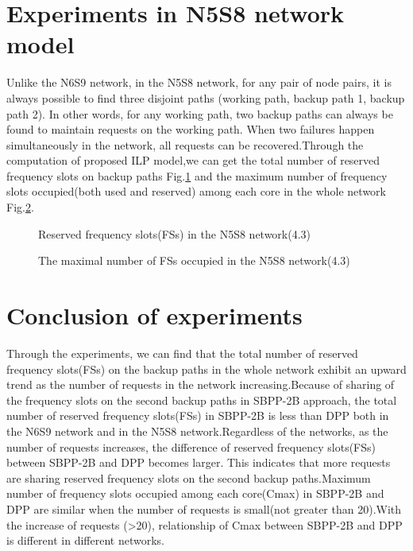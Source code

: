 \documentclass[a4paper,11pt]{report}
\begin{document}
\section{Experiments in N5S8 network model}
    Unlike the N6S9 network, in the N5S8 network, for any pair of node pairs, it is always possible to find three disjoint paths (working path, backup path 1, backup path 2). In other words, for any working path, two backup paths can always be found to maintain requests on the working path. When two failures happen simultaneously in the network, all requests can be recovered.Through the computation of proposed ILP model,we can get the total number of reserved frequency slots on backup paths Fig.\ref{figure:N5_FS} and the maximum number of frequency slots occupied(both used and reserved) among each core in the whole network Fig.\ref{figure:N5_Cmax}.
    
    \begin{figure}[htbp]
    \begin{center}
    \end{center}
    \caption{Reserved frequency slots(FSs) in the N5S8 network(4.3)}
    \label{figure:N5_FS}
    \end{figure}
   
    \begin{figure}[htbp]
    \begin{center}
    \end{center}
    \caption{The maximal number of FSs occupied in the N5S8 network(4.3)}
    \label{figure:N5_Cmax}
    \end{figure}

\section{Conclusion of experiments}
    Through the experiments, we can find that the total number of reserved frequency slots(FSs) on the backup paths in the whole network exhibit an upward trend as the number of requests in the network increasing.Because of sharing of the frequency slots on the second backup paths in SBPP-2B approach, the total number of reserved frequency slots(FSs) in SBPP-2B is less than DPP both in the N6S9 network and in the N5S8 network.Regardless of the networks, as the number of requests increases, the difference of reserved frequency slots(FSs) between SBPP-2B and DPP becomes larger. This indicates that more requests are sharing reserved frequency slots on the second backup paths.Maximum number of frequency slots occupied among each core(Cmax) in SBPP-2B and DPP are similar when the number of requests is small(not greater than 20).With the increase of requests (>20), relationship of Cmax between SBPP-2B and DPP is different in different networks.\par
\end{document}
